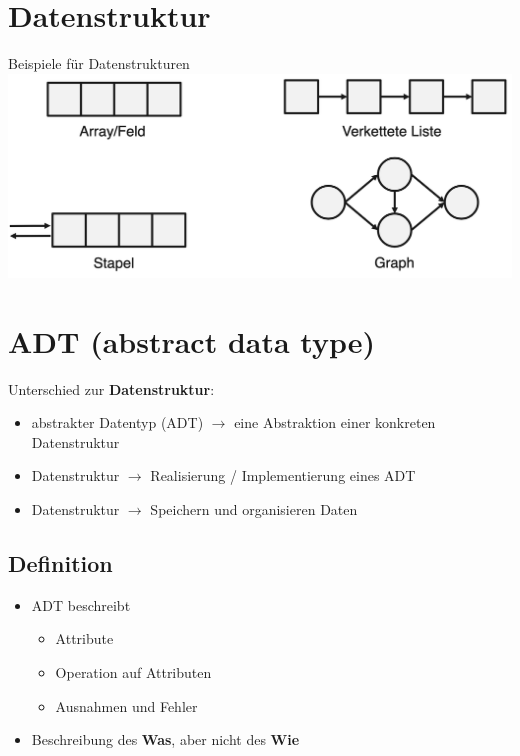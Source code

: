\documentclass[a4paper, landscape, 8pt]{scrartcl}
\begin{document}
\begin{multicols*}{4}
            \section{Datenstruktur}
                \textcolor{subsectioncolor}{Beispiele für Datenstrukturen}
                \newline
                \includegraphics[scale=0.12]{graphic/06_adt_beispiele}

            \section{ADT (abstract data type)}
            Unterschied zur {\bfseries Datenstruktur}:
            \begin{itemize}
                \item abstrakter Datentyp (ADT) $\to$ eine Abstraktion einer konkreten Datenstruktur
                \item Datenstruktur $\to$ Realisierung / Implementierung eines ADT
                \item Datenstruktur $\to$ Speichern und organisieren Daten
            \end{itemize}
            \subsection{Definition}
                \begin{itemize}
                    \item ADT beschreibt
                    \begin{itemize}
                        \item Attribute
                        \item Operation auf Attributen
                        \item Ausnahmen und Fehler
                    \end{itemize}
                    \item Beschreibung des {\bfseries Was}, aber nicht des {\bfseries Wie}
                \end{itemize}


\end{multicols*}
\end{document}
